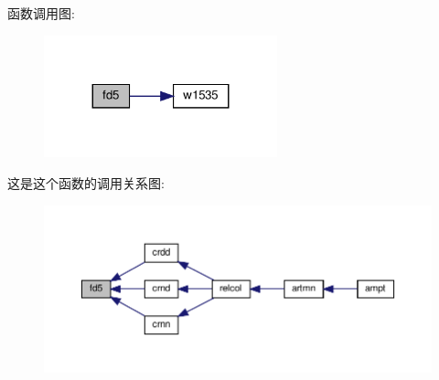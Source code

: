 函数调用图\+:
\nopagebreak
\begin{figure}[H]
\begin{center}
\leavevmode
\includegraphics[width=191pt]{fd5_8f90_a192eba44f1e1ab491b44142f9507b391_cgraph}
\end{center}
\end{figure}
这是这个函数的调用关系图\+:
\nopagebreak
\begin{figure}[H]
\begin{center}
\leavevmode
\includegraphics[width=350pt]{fd5_8f90_a192eba44f1e1ab491b44142f9507b391_icgraph}
\end{center}
\end{figure}
